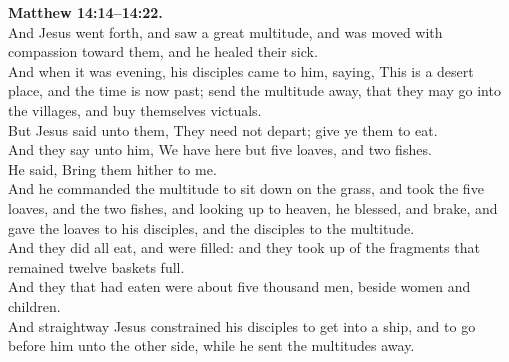\documentclass[10pt]{article} %
\begin{document}
{\begin{minipage}[t]{0.45\textwidth}
\textbf{Matthew 14:14--14:22.}\\
And Jesus went forth, and saw a great multitude, and was moved with compassion toward them, and he healed their sick.\\
And when it was evening, his disciples came to him, saying, This is a desert place, and the time is now past; send the multitude away, that they may go into the villages, and buy themselves victuals.\\
But Jesus said unto them, They need not depart; give ye them to eat.\\
And they say unto him, We have here but five loaves, and two fishes.\\
He said, Bring them hither to me.\\
And he commanded the multitude to sit down on the grass, and took the five loaves, and the two fishes, and looking up to heaven, he blessed, and brake, and gave the loaves to his disciples, and the disciples to the multitude.\\
And they did all eat, and were filled: and they took up of the fragments that remained twelve baskets full.\\
And they that had eaten were about five thousand men, beside women and children.\\
And straightway Jesus constrained his disciples to get into a ship, and to go before him unto the other side, while he sent the multitudes away.\\

\end{minipage}}
\vspace*{\fill}
\newpage
\Huge%
\vspace*{\fill}
\begin{spacing}{1.3}
\end{spacing}
\vspace*{\fill}
\end{document}
